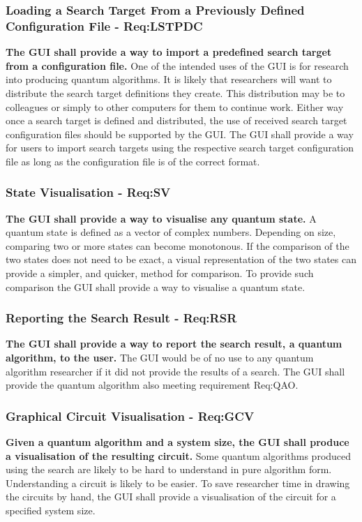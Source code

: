 \subsubsection{Loading a Search Target From a Previously Defined Configuration File - Req:LSTPDC}
\label{sec:reqlstpdc}
\textbf{The GUI shall provide a way to import a predefined search target from a configuration file.}
One of the intended uses of the GUI is for research into producing quantum algorithms.
It is likely that researchers will want to distribute the search target definitions they create.
This distribution may be to colleagues or simply to other computers for them to continue work.
Either way once a search target is defined and distributed, the use of received search target configuration files should be supported by the GUI.
The GUI shall provide a way for users to import search targets using the respective search target configuration file as long as the configuration file is of the correct format.

\subsubsection{State Visualisation - Req:SV}
\label{sec:reqsv}
\textbf{The GUI shall provide a way to visualise any quantum state.}
A quantum state is defined as a vector of complex numbers.
Depending on size, comparing two or more states can become monotonous.
If the comparison of the two states does not need to be exact, a visual representation of the two states can provide a simpler, and quicker, method for comparison.
To provide such comparison the GUI shall provide a way to visualise a quantum state.

\subsubsection{Reporting the Search Result - Req:RSR}
\label{sec:reqrsr}
\textbf{The GUI shall provide a way to report the search result, a quantum algorithm, to the user.}
The GUI would be of no use to any quantum algorithm researcher if it did not provide the results of a search.
The GUI shall provide the quantum algorithm also meeting requirement Req:QAO.

\subsubsection{Graphical Circuit Visualisation - Req:GCV}
\label{sec:reqgcv}
\textbf{Given a quantum algorithm and a system size, the GUI shall produce a visualisation of the resulting circuit.}
Some quantum algorithms produced using the search are likely to be hard to understand in pure algorithm form.
Understanding a circuit is likely to be easier.
To save researcher time in drawing the circuits by hand, the GUI shall provide a visualisation of the circuit for a specified system size.

